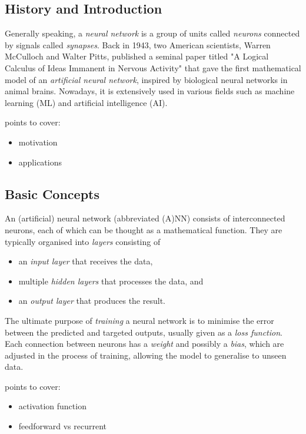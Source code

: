 \documentclass[a4paper,11pt, titlepage]{article}
\theoremstyle{definition}
\theoremstyle{plain}
\theoremstyle{remark}
\begin{document}
\subsection{History and Introduction}

Generally speaking, a \textit{neural network} is a group of units called \textit{neurons} connected by signals called \textit{synapses}. Back in 1943, two American scientists, Warren McCulloch and Walter Pitts, published a seminal paper titled "A Logical Calculus of Ideas Immanent in Nervous Activity" that gave the first mathematical model of an \textit{artificial neural network}, inspired by biological neural networks in animal brains. Nowadays, it is extensively used in various fields such as machine learning (ML) and artificial intelligence (AI).

points to cover:

\begin{itemize}
    \item motivation
    \item applications
\end{itemize}

\subsection{Basic Concepts}

An (artificial) neural network (abbreviated (A)NN) consists of interconnected neurons, each of which can be thought as a mathematical function. They are typically organised into \textit{layers} consisting of

\begin{itemize}
    \item an \textit{input layer} that receives the data,
    \item multiple \textit{hidden layers} that processes the data, and
    \item an \textit{output layer} that produces the result.
\end{itemize}

The ultimate purpose of \textit{training} a neural network is to minimise the error between the predicted and targeted outputs, usually given as a \textit{loss function}. Each connection between neurons has a \textit{weight} and possibly a \textit{bias}, which are adjusted in the process of training, allowing the model to generalise to unseen data.

points to cover:

\begin{itemize}
    \item activation function
    \item feedforward vs recurrent
\end{itemize}
\end{document}

